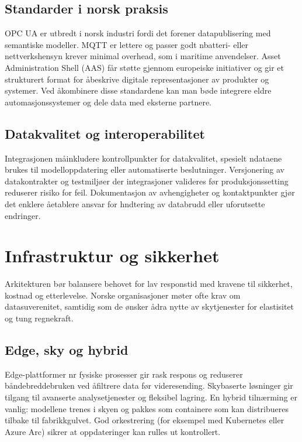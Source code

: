 \subsection{Standarder i norsk praksis}
OPC UA er utbredt i norsk industri fordi det forener datapublisering med semantiske modeller. MQTT er lettere og passer godt n\aar batteri- eller nettverkshensyn krever minimal overhead, som i maritime anvendelser. Asset Administration Shell (AAS) f\aa r st\o tte gjennom europeiske initiativer og gir et strukturert format for \aa beskrive digitale representasjoner av produkter og systemer. Ved \aa kombinere disse standardene kan man b\o de integrere eldre automasjonssystemer og dele data med eksterne partnere.

\subsection{Datakvalitet og interoperabilitet}
Integrasjonen m\aa inkludere kontrollpunkter for datakvalitet, spesielt n\aar dataene brukes til modelloppdatering eller automatiserte beslutninger. Versjonering av datakontrakter og testmilj\o er der integrasjoner valideres f\o r produksjonssetting reduserer risiko for feil. Dokumentasjon av avhengigheter og kontaktpunkter gj\o r det enklere \aa etablere ansvar for h\a ndtering av databrudd eller uforutsette endringer.

\section{Infrastruktur og sikkerhet}
Arkitekturen b\o r balansere behovet for lav responstid med kravene til sikkerhet, kostnad og etterlevelse. Norske organisasjoner m\o ter ofte krav om datasuverenitet, samtidig som de \o nsker \aa dra nytte av skytjenester for elastisitet og tung regnekraft.

\subsection{Edge, sky og hybrid}
Edge-plattformer n\a r fysiske prosesser gir rask respons og reduserer b\aa ndebreddebruken ved \aa filtrere data f\o r videresending. Skybaserte løsninger gir tilgang til avanserte analysetjenester og fleksibel lagring. En hybrid tilnærming er vanlig: modellene trenes i skyen og pakkes som containere som kan distribueres tilbake til fabrikkgulvet. God orkestrering (for eksempel med Kubernetes eller Azure Arc) sikrer at oppdateringer kan rulles ut kontrollert.

